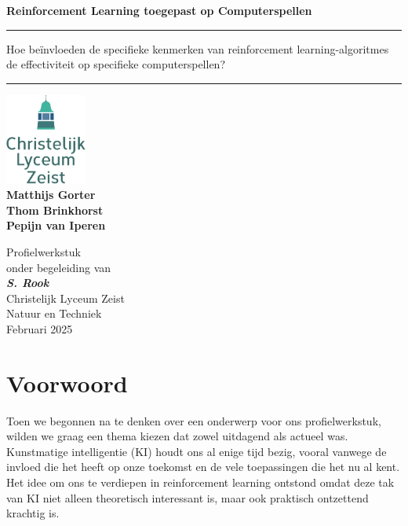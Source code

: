 \documentclass[a4paper,10pt]{report}
\begin{document}


\begin{titlepage}
    \centering
    \vspace*{1cm}
    \Huge\textbf{Reinforcement Learning toegepast op Computerspellen} \\
    \vspace{1cm}
    \rule{\linewidth}{0.4mm}
    \Large
    Hoe beïnvloeden de specifieke kenmerken van reinforcement learning-algoritmes de effectiviteit op specifieke computerspellen?
    \rule{\linewidth}{0.4mm}

    \vspace{1.5cm}
    \includegraphics[width=0.2\textwidth]{../assets/logo-clz.png} \\
    \vspace{1.5cm}
    \large
    \textbf{Matthijs Gorter} \\
    \textbf{Thom Brinkhorst} \\
    \textbf{Pepijn van Iperen} \\
    \vspace{\fill}
    \normalsize

    Profielwerkstuk \\ onder begeleiding van \\ \textit{\textbf{S. Rook}} \\
    Christelijk Lyceum Zeist \\ Natuur en Techniek \\ Februari 2025 \\ \newpage
\end{titlepage}

\chapter*{Voorwoord}

Toen we begonnen na te denken over een onderwerp voor ons profielwerkstuk,
wilden we graag een thema kiezen dat zowel uitdagend als actueel was.
Kunstmatige intelligentie (KI) houdt ons al enige tijd bezig, vooral vanwege de
invloed die het heeft op onze toekomst en de vele toepassingen die het nu al
kent. Het idee om ons te verdiepen in reinforcement learning ontstond omdat
deze tak van KI niet alleen theoretisch interessant is, maar ook praktisch
ontzettend krachtig is.
\end{document}
